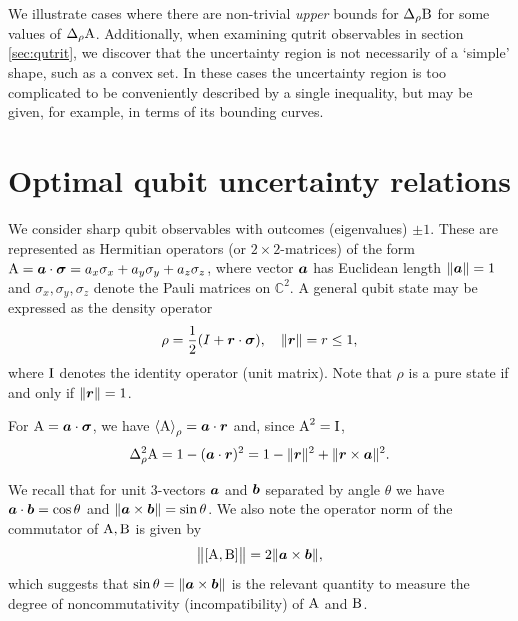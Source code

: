 We illustrate cases where there are non-trivial \emph{upper} bounds for $\sdevr{\opb}$ for some values of $\sdevr{\opa}$. Additionally, when examining qutrit observables in section \ref{sec:qutrit}, we discover that the uncertainty region is not necessarily of a `simple' shape, such as a convex set. In these cases the uncertainty region is too complicated to be conveniently described by a single inequality, but may be given, for example, in terms of its bounding curves.

\section{Optimal qubit uncertainty relations}\label{sec:qubit}

We consider sharp qubit observables with outcomes (eigenvalues) $\pm 1$. These are represented as Hermitian operators (or $2\times 2$-matrices) of the form $\operatorname{A}=\bm{a}\cdot{\boldsymbol\sigma}=a_x\sigma_x+a_y\sigma_y+a_z\sigma_z$, where vector $\bm{a}$ has Euclidean length  $\|\bm{a}\|=1$ and  $\sigma_x,\sigma_y,\sigma_z$ denote the Pauli matrices on ${\mathbb C}^2$. A general qubit state may be expressed as the density operator
\begin{equation}
  \rho=\frac12(I+\bm{r}\cdot{\boldsymbol\sigma}),\quad \|\bm{r}\|=r\le 1,
\end{equation}
where $\operatorname{I}$ denotes the identity operator (unit matrix). Note that $\rho$ is a pure state if and only if $\|\bm{r}\|=1$.

For $\operatorname{A}=\bm{a}\cdot{\boldsymbol\sigma}$, we have  $\left\langle {\operatorname{A}}\right\rangle_\rho=\bm{a}\cdot\bm{r}$ and, since $\operatorname{A}^2=\operatorname{I}$,
\begin{equation}
  \varr{\opa}=1-(\boa\cdot\bor)^2=1-\|\bor\|^2+\|\bor\times\boa\|^2.
\end{equation}

We recall  that for unit 3-vectors $\bm{a}$ and $\bm{b}$ separated by angle $\theta$ we have $\bm{a}\cdot\bm{b}=\cos\theta$ and $\|\bm{a}\times\bm{b}\| = \sin\theta$.
We also note  the operator norm of the commutator of $\operatorname{A},\operatorname{B}$ is given by
\begin{equation}
  \bigl\|[\operatorname{A},\operatorname{B}]\bigr\| = 2\|\bm{a}\times\bm{b}\|,
\end{equation}
which suggests that $\sin\theta=\|\bm{a}\times\bm{b}\|$ is the relevant quantity to measure the degree of noncommutativity (incompatibility) of $\operatorname{A}$ and $\operatorname{B}$.


